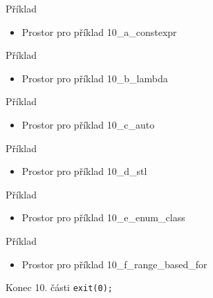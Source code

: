 \documentclass{beamer}
\begin{document}
\begin{xframe}{Příklad}
	\begin{itemize}
		\item Prostor pro příklad 10\_a\_constexpr
	\end{itemize}
\end{xframe}




\begin{xframe}{Příklad}
	\begin{itemize}
		\item Prostor pro příklad 10\_b\_lambda
	\end{itemize}
\end{xframe}

\begin{xframe}{Příklad}
	\begin{itemize}
		\item Prostor pro příklad 10\_c\_auto
	\end{itemize}
\end{xframe}

\begin{xframe}{Příklad}
	\begin{itemize}
		\item Prostor pro příklad 10\_d\_stl
	\end{itemize}
\end{xframe}

\begin{xframe}{Příklad}
	\begin{itemize}
		\item Prostor pro příklad 10\_e\_enum\_class
	\end{itemize}
\end{xframe}

\begin{xframe}{Příklad}
	\begin{itemize}
		\item Prostor pro příklad 10\_f\_range\_based\_for
	\end{itemize}
\end{xframe}




\begin{xframe}{Konec 10. části}
\texttt{exit(0);}
\end{xframe}
\end{document}
